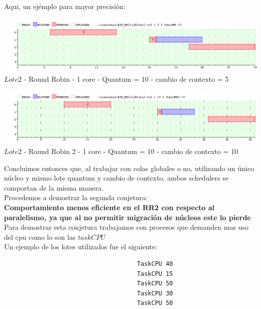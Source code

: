  Aqui, un ejémplo para mayor precisión:\\
 
  \begin{center}
    	\includegraphics[width=450pt]{./EJ8_RR2/dif3corerr.png}
	{$Lote 2$ - Round Robin - 1 core - Quantum = 10 - cambio de contexto = 5}	
 \end{center}
 
 \begin{center}
    	\includegraphics[width=450pt]{./EJ8_RR2/dif3corerr2.png}
	{$Lote 2$ - Round Robin 2 - 1 core - Quantum = 10 - cambio de contexto = 10}	
 \end{center}
 
 Concluimos entonces que, al trabajar con colas globales o no, utilizando un único núcleo y
 mismo lote quantum y cambio de contexto, ambos schedulers se comportan de la misma
 manera.\\
 
 Procedemos a demostrar la segunda conjetura:\\
 
 \textbf{Comportamiento menos eficiente en el RR2 con respecto al paralelismo, ya que al no permitir
migración de núcleos este lo pierde}\\

Para demostrar esta conjetura trabajamos con procesos que demanden mas uso del cpu como 
lo son las $taskCPU$\\

Un ejemplo de los lotes utilizados fue el siguiente:\\

\begin{verbatim}
                                     TaskCPU 40
                                     TaskCPU 15
                                     TaskCPU 50
                                     TaskCPU 30
                                     TaskCPU 50
\end{verbatim}

